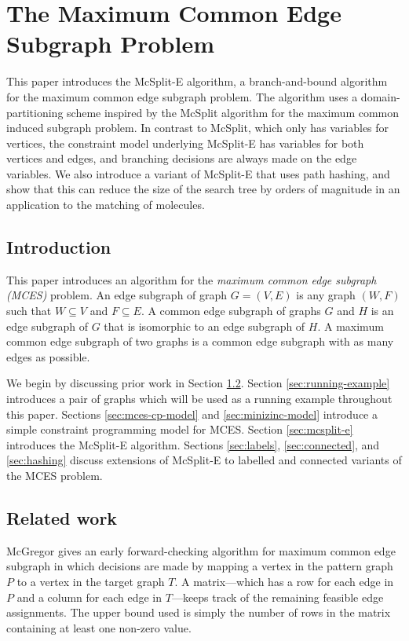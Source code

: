 \chapter{The Maximum Common Edge Subgraph Problem}
\label{c:mcsplite}

This paper introduces the McSplit-E algorithm, a branch-and-bound algorithm for the maximum common edge subgraph problem.  The algorithm uses a domain-partitioning scheme inspired by the McSplit algorithm for the maximum common induced subgraph problem.  In contrast to McSplit, which only has variables for vertices, the constraint model underlying McSplit-E has variables for both vertices and edges, and branching decisions are always made on the edge variables.  We also introduce a variant of McSplit-E that uses path hashing, and show that this can reduce the size of the search tree by orders of magnitude in an application to the matching of molecules.

\section{Introduction}

This paper introduces an algorithm for the \emph{maximum common edge subgraph (MCES)} problem.
An edge subgraph of graph $G=(V, E)$
is any graph $(W, F)$ such that $W \subseteq V$ and $F \subseteq E$.  
A common edge subgraph of graphs $G$ and $H$ is an edge subgraph of $G$ that is
isomorphic to an edge subgraph of $H$. A maximum common edge subgraph of two
graphs is a common edge subgraph with as many edges as possible.

We begin by discussing prior work in Section \ref{sec:related-work}.
Section \ref{sec:running-example} introduces a pair of graphs which will be
used as a running example throughout this paper.
Sections \ref{sec:mces-cp-model} and \ref{sec:minizinc-model} introduce
a simple constraint programming model for MCES.
Section \ref{sec:mcsplit-e} introduces the McSplit-E algorithm.
Sections \ref{sec:labels}, \ref{sec:connected}, and \ref{sec:hashing}
discuss extensions of McSplit-E to labelled and connected variants of the MCES problem.

\section{Related work}\label{sec:related-work}

McGregor \cite{DBLP:journals/spe/McGregor82} gives an early forward-checking algorithm
for maximum common edge subgraph in which decisions
are made by mapping a vertex in the pattern graph $P$ to a vertex in the target graph $T$.
A matrix---which has a row for each
edge in $P$ and a column for each edge in $T$---keeps track of the remaining feasible edge
assignments.  The upper bound used is simply the number of rows in the matrix containing at
least one non-zero value.

